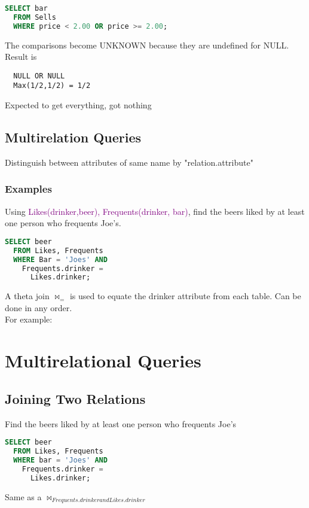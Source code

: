 \documentclass[12pt]{article}
\begin{document}
\begin{lstlisting}[language=SQL]
  SELECT bar
  FROM Sells
  WHERE price < 2.00 OR price >= 2.00;
\end{lstlisting}
The comparisons become UNKNOWN because they are undefined for NULL.\\
Result is 
\begin{verbatim}
  NULL OR NULL
  Max(1/2,1/2) = 1/2
\end{verbatim}
Expected to get everything, got nothing

\subsection{Multirelation Queries}
Distinguish between attributes of same name by 
"relation.attribute"

\subsubsection{Examples}
Using \textcolor{purple}{Likes(drinker,beer), Frequents(drinker, bar)},
find the beers liked by at least one person who frequents Joe's.
\begin{lstlisting}[language=SQL]
  SELECT beer
  FROM Likes, Frequents
  WHERE Bar = 'Joes' AND
    Frequents.drinker = 
      Likes.drinker;
\end{lstlisting}
A theta join $\Join_{=}$ is used to equate the drinker attribute from each table.
Can be done in any order.\\
For example:



\section{Multirelational Queries}
\subsection{Joining Two Relations}
Find the beers liked by at least one person who frequents Joe's
\begin{lstlisting}[language=SQL]
  SELECT beer
  FROM Likes, Frequents
  WHERE bar = 'Joes' AND
    Frequents.drinker = 
      Likes.drinker;
\end{lstlisting}
Same as a $\Join_{Frequents.drinker and Likes.drinker}$
\end{document}

